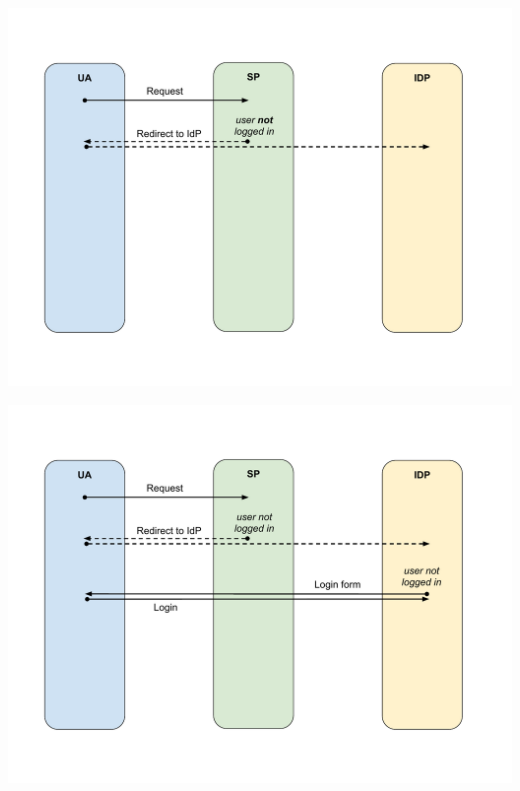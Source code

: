 \documentclass[ignorenonframetext,aspectratio=169]{beamer}
\begin{document}
\begin{frame}[plain]
\centering
\includegraphics[height=\paperheight]{fedsso-proto-2.pdf}
\end{frame}

\begin{frame}[plain]
\centering
\includegraphics[height=\paperheight]{fedsso-proto-3.pdf}
\end{frame}
\end{document}
